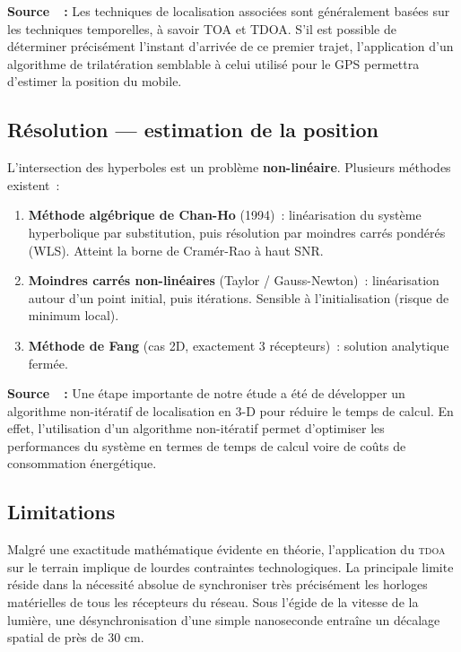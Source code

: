 \documentclass[12pt, a4paper]{article}
\newcommand{\TDOA}{\textsc{tdoa}}
\begin{document}
\begin{citebox}
\textbf{Source~\cite{Evennou2007}~:} \og{}Les techniques de localisation associées
sont généralement basées sur les techniques temporelles, à savoir TOA et TDOA.
S'il est possible de déterminer précisément l'instant d'arrivée de ce premier trajet,
l'application d'un algorithme de trilatération semblable à celui utilisé pour le GPS
permettra d'estimer la position du mobile.\fg{}
\end{citebox}

\subsection{Résolution — estimation de la position}

L'intersection des hyperboles est un problème \textbf{non-linéaire}. Plusieurs
méthodes existent~:

\begin{enumerate}[label=\alph*)]
  \item \textbf{Méthode algébrique de Chan-Ho} (1994)~: linéarisation du système
        hyperbolique par substitution, puis résolution par moindres carrés pondérés
        (WLS). Atteint la borne de Cramér-Rao à haut SNR.

  \item \textbf{Moindres carrés non-linéaires} (Taylor / Gauss-Newton)~:
        linéarisation autour d'un point initial, puis itérations. Sensible à
        l'initialisation (risque de minimum local).

  \item \textbf{Méthode de Fang} (cas 2D, exactement 3 récepteurs)~:
        solution analytique fermée.
\end{enumerate}

\begin{citebox}
\textbf{Source~\cite{Kossonou2014}~:} \og{}Une étape importante de notre étude a
été de développer un algorithme non-itératif de localisation en 3-D pour réduire
le temps de calcul. En effet, l'utilisation d'un algorithme non-itératif permet
d'optimiser les performances du système en termes de temps de calcul voire de
coûts de consommation énergétique.\fg{}
\end{citebox}

\subsection{Limitations}

Malgré une exactitude mathématique évidente en théorie, l'application du \TDOA{} sur le terrain implique de lourdes contraintes technologiques. La principale limite réside dans la nécessité absolue de synchroniser très précisément les horloges matérielles de tous les récepteurs du réseau. Sous l'égide de la vitesse de la lumière, une désynchronisation d'une simple nanoseconde entraîne un décalage spatial de près de $30\text{ cm}$.
\end{document}
